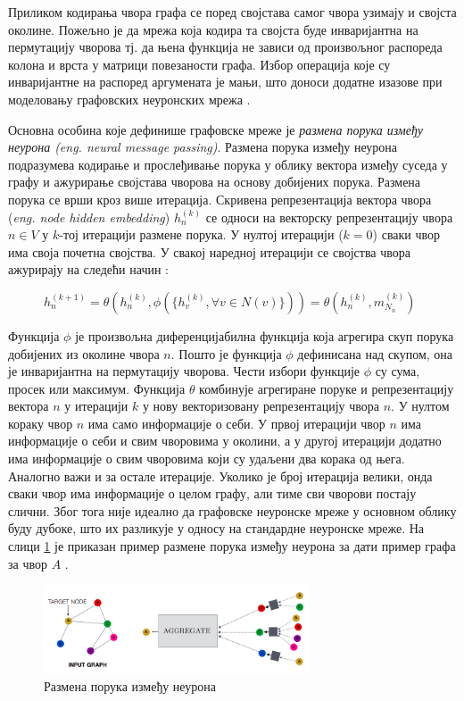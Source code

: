 \documentclass[11pt,oneside]{memoir}
\begin{document}
Приликом кодирања чвора графа се поред својстава самог чвора узимају и својста околине. Пожељно је да мрежа која кодира та својста
буде инваријантна на пермутацију чворова тј. да њена функција не зависи од произвољног распореда колона и врста у матрици повезаности графа. Избор
операција које су инваријантне на распоред аргумената је мањи, што доноси додатне изазове при моделовању графовских неуронских мрежа \cite{grl}.

Основна особина које дефинише графовске мреже је \textit{размена порука између неурона (eng. neural message passing)}. Размена порука између неурона
подразумева кодирање и прослеђивање порука у облику вектора између суседа у графу и ажурирање својстава чворова на основу добијених порука. Размена
порука се врши кроз више итерација. Скривена репрезентација вектора чвора (\textit{eng. node hidden embedding}) $h^{(k)}_n$ се односи на 
векторску репрезентацију чвора $n \in V$ у $k$-тој итерацији размене порука. У нултој итерацији ($k=0$) сваки чвор има своја почетна својства. У 
свакој наредној итерацији се својства чвора ажурирају на следећи начин \cite{grl}:

\begin{figure}[H]
  \centering
  $h^{(k+1)}_n = \theta (h^{(k)}_n, \phi (\{h^{(k)}_v, \forall v \in N(v)\})) = \theta (h^{(k)}_n, m^{(k)}_{N_{n}})$
\end{figure}

Функција $\phi$ је произвољна диференцијабилна функција која агрегира скуп порука добијених из околине чвора $n$. Пошто је функција $\phi$
дефинисана над скупом, она је инваријантна на пермутацију чворова. Чести избори функције $\phi$ су сума, просек или максимум. 
Функција $\theta$ комбинује агрегиране поруке и репрезентацију вектора $n$ у
итерацији $k$ у нову векторизовану репрезентацију чвора $n$. У нултом кораку чвор $n$ има само информације о себи. У првој итерацији чвор $n$ има
информације о себи и свим чворовима у околини, а у другој итерацији додатно има информације о свим чворовима који су удаљени два корака од њега. 
Аналогно важи и за остале итерације. Уколико је број итерација велики, онда сваки чвор има информације о целом графу, али тиме сви чворови постају
слични. Због тога није идеално да графовске неуронске мреже у основном облику буду дубоке, што их разликује у односу на стандардне неуронске
мреже. На слици \ref{nmp} је приказан пример размене порука између неурона за дати пример графа за чвор $A$ \cite{grl}. 

\begin{figure}[H]
  \centering
  \includegraphics[width=0.7\textwidth]{images/nmp.png}
  \caption{Размена порука између неурона \label{nmp}}
\end{figure}
\end{document}
